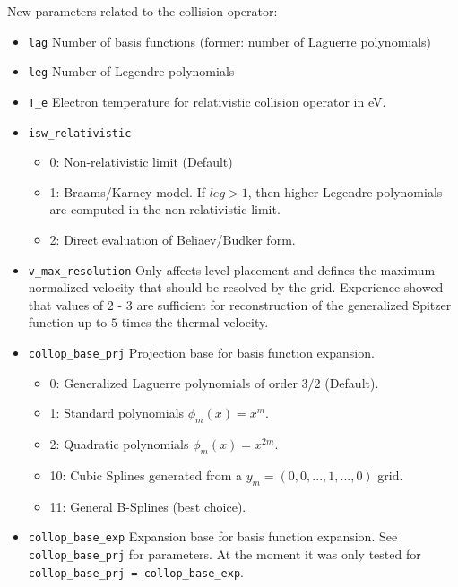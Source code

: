 \documentclass{article}
\begin{document}
New parameters related to the collision operator:
\begin{itemize}
 \item \verb|lag|\newline
 Number of basis functions (former: number of Laguerre polynomials)
 \item \verb|leg|\newline
 Number of Legendre polynomials
 \item \verb|T_e|\newline
 Electron temperature for relativistic collision operator in eV.
 \item \verb|isw_relativistic|
 \begin{itemize}
  \item 0: Non-relativistic limit (Default)
  \item 1: Braams/Karney model. If $leg>1$, then higher Legendre
  polynomials are computed in the non-relativistic limit.
  \item 2: Direct evaluation of Beliaev/Budker form.
 \end{itemize}
 \item \verb|v_max_resolution|\newline
 Only affects level placement and defines the maximum normalized
 velocity that should be resolved by the grid. Experience showed that
 values of $2$ - $3$ are sufficient for reconstruction of the
 generalized Spitzer function up to $5$ times the thermal velocity.
 \item \verb|collop_base_prj|\newline
 Projection base for basis function expansion.
 \begin{itemize}
  \item 0: Generalized Laguerre polynomials of order $3/2$ (Default).
  \item 1: Standard polynomials $\phi_m(x) = x^m$.
  \item 2: Quadratic polynomials $\phi_m(x) = x^{2m}$.
  \item 10: Cubic Splines generated from a $y_m = (0, 0, ..., 1, ..., 0)$ grid.
  \item 11: General B-Splines (best choice).
 \end{itemize}

 \item \verb|collop_base_exp|\newline
 Expansion base for basis function expansion. See \verb|collop_base_prj|
 for parameters. At the moment it was only tested for
 \verb|collop_base_prj = collop_base_exp|.


\end{itemize}
\end{document}
